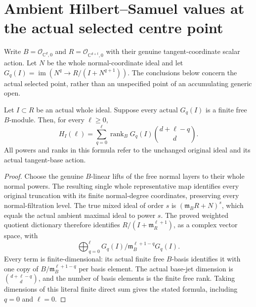 \section{Ambient Hilbert--Samuel values at the actual selected centre point}
\label{sec:hironaka-actual-hs-constant-centre-ambient-convolution}

Write $B=\mathcal O_{\mathbb C^d,0}$ and
$R=\mathcal O_{\mathbb C^{d+t},0}$ with their genuine tangent-coordinate
scalar action. Let $N$ be the whole normal-coordinate ideal and let
$G_q(I)=\operatorname{im}(N^q\to R/(I+N^{q+1}))$.
The conclusions below concern the actual selected point, rather than
an unspecified point of an accumulating generic open.

\begin{lemma}
\label{hir:actual-selected-normal-free-ambient-hs-convolution}
\leanok
Let $I\subset R$ be an actual whole ideal. Suppose every actual
$G_q(I)$ is a finite free $B$-module. Then, for every $\ell\ge0$,
\[
 H_I(\ell)=\sum_{q=0}^{\ell}
   \operatorname{rank}_B G_q(I)\binom{d+\ell-q}{d}.
\]
All powers and ranks in this formula refer to the unchanged original
ideal and its actual tangent-base action.
\end{lemma}
\begin{proof}
Choose the genuine $B$-linear lifts of the free normal layers to their
whole normal powers. The resulting single whole representative map
identifies every original truncation with its finite normal-degree
coordinates, preserving every normal-filtration level. The true
mixed ideal of order $s$ is $(\mathfrak m_B R+N)^s$, which equals
the actual ambient maximal ideal to power $s$. The proved weighted
quotient dictionary therefore identifies
$R/(I+\mathfrak m_R^{\ell+1})$, as a complex vector space, with
\[
 \bigoplus_{q=0}^{\ell}
 G_q(I)/\mathfrak m_B^{\ell+1-q}G_q(I).
\]
Every term is finite-dimensional: its actual finite free $B$-basis
identifies it with one copy of $B/\mathfrak m_B^{\ell+1-q}$ per
basis element. The actual base-jet dimension is
$\binom{d+\ell-q}{d}$, and the number of basis elements is the
finite free rank. Taking dimensions of this literal finite direct
sum gives the stated formula, including $q=0$ and $\ell=0$.
\end{proof}

